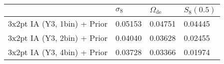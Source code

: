 \begin{tabular}{llll}
\toprule
{} & $\sigma_8$ & $\Omega_\mathrm{de}$ & $S_8(0.5)$ \\
\midrule
3x2pt IA (Y3, 1bin) + Prior &    0.05153 &              0.04751 &    0.04445 \\
3x2pt IA (Y3, 2bin) + Prior &    0.04040 &              0.03628 &    0.02455 \\
3x2pt IA (Y3, 4bin) + Prior &    0.03728 &              0.03366 &    0.01974 \\
\bottomrule
\end{tabular}

